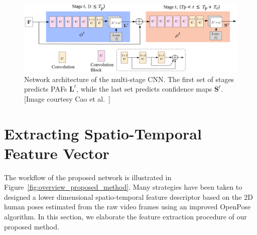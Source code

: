 \begin{figure}
	\centering
	\includegraphics[width=\textwidth]{figures/openpose_architecture.eps}
	\caption[Network architecture of the multi-stage CNN]
	{Network architecture  of  the  multi-stage  CNN.  The  first  set of stages predicts PAFs $\textbf{L}^t$, while the last set predicts confidence  maps $ \textbf{S}^{t}$. [Image courtesy Cao et al.~\cite{Cao_19}] \label{fig:openpose_architecture}}
\end{figure}




\section{Extracting Spatio-Temporal Feature Vector}
The workflow of the proposed network is illustrated in Figure~\ref{fig:overview_proposed_method}. Many strategies have been taken to designed a lower dimensional spatio-temporal feature descriptor based on the 2D human poses estimated from the raw video frames using an improved OpenPose~\cite{Cao_19} algorithm. In this section, we elaborate the feature extraction procedure of our proposed method. 

